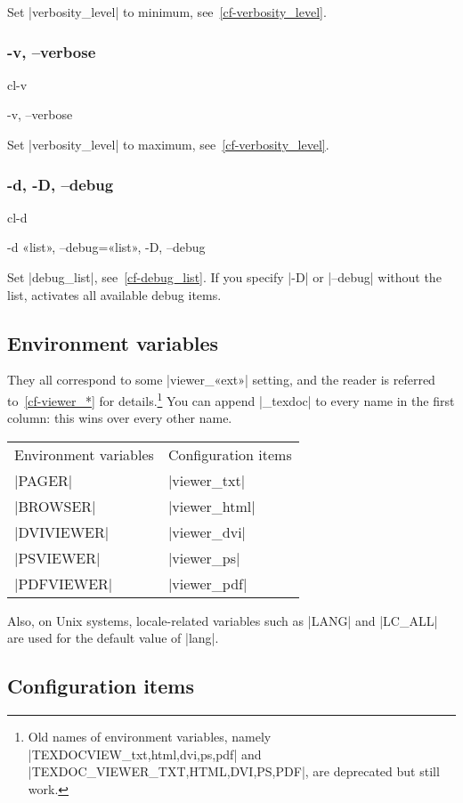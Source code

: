 \documentclass[a4paper, oneside]{scrartcl}
\newif\ifframed
\newenvironment{cmdsubsub}[2]{%
  \framedfalse \commandes\subsubsection{#1}{#2}%
  }{%
  \endcommandes}
\begin{document}
Set |verbosity_level| to minimum, see~\ref{cf-verbosity_level}.

\begin{cmdsubsub}{-v, --verbose}{cl-v}
  -v, --verbose
\end{cmdsubsub}

Set |verbosity_level| to maximum, see~\ref{cf-verbosity_level}.

\begin{cmdsubsub}{-d, -D, --debug}{cl-d}
  -d «list», --debug=«list», -D, --debug
\end{cmdsubsub}

Set |debug_list|, see~\ref{cf-debug_list}. If you specify |-D| or |--debug|
without the list, activates all available debug items.

\subsection{Environment variables}\label{ss-envvar}

They all correspond to some |viewer_«ext»| setting, and the reader is referred
to~\ref{cf-viewer_*} for details.\footnote{Old names of environment variables,
namely |TEXDOCVIEW_{txt,html,dvi,ps,pdf}| and
|TEXDOC_VIEWER_{TXT,HTML,DVI,PS,PDF}|, are deprecated but still work.} You can
append |_texdoc| to every name in the first column: this wins over every other
name.

\begin{center}
\begin{tabular}{ll}
Environment variables & Configuration items \\
|PAGER|               & |viewer_txt|        \\
|BROWSER|             & |viewer_html|       \\
|DVIVIEWER|           & |viewer_dvi|        \\
|PSVIEWER|            & |viewer_ps|         \\
|PDFVIEWER|           & |viewer_pdf|        \\
\end{tabular}
\end{center}

Also, on Unix systems, locale-related variables such as |LANG| and |LC_ALL|
are used for the default value of |lang|.

\subsection{Configuration items}\label{ss-conf}
\end{document}
